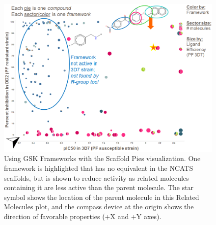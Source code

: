 \documentclass[journal=jacsat,manuscript=article]{achemso}
\begin{document}
\begin{figure}
\includegraphics[width=5in]{fig/mol1_frames_scafpie.png}
\caption{Using GSK Frameworks with the Scaffold Pies visualization. One framework is highlighted that has no equivalent in the NCATS scaffolds, but is shown to reduce activity as related molecules containing it are less active than the parent molecule.   The star symbol shows the location of the parent molecule in this Related Molecules plot, and the compass device at the origin shows the direction of favorable properties (+X and +Y axes).}      
\label{fig:frameswalk}
\end{figure}
\end{document}
